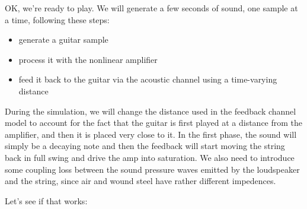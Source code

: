 \documentclass[11pt]{article}
\providecommand{\tightlist}{%
      \setlength{\itemsep}{0pt}\setlength{\parskip}{0pt}}
\begin{document}
    OK, we're ready to play. We will generate a few seconds of sound, one
sample at a time, following these steps:

\begin{itemize}
\tightlist
\item
  generate a guitar sample
\item
  process it with the nonlinear amplifier
\item
  feed it back to the guitar via the acoustic channel using a
  time-varying distance
\end{itemize}

During the simulation, we will change the distance used in the feedback
channel model to account for the fact that the guitar is first played at
a distance from the amplifier, and then it is placed very close to it.
In the first phase, the sound will simply be a decaying note and then
the feedback will start moving the string back in full swing and drive
the amp into saturation. We also need to introduce some coupling loss
between the sound pressure waves emitted by the loudspeaker and the
string, since air and wound steel have rather different impedences.

Let's see if that works:
\end{document}
